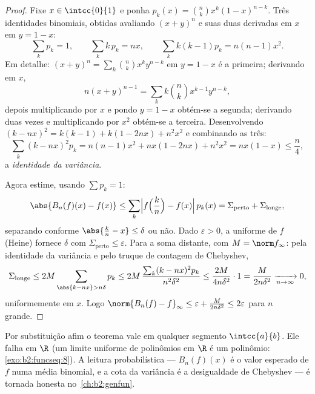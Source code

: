 \begin{proof}
Fixe $x \in \intcc{0}{1}$ e ponha $p_k(x) = \binom nk x^k(1 -
x)^{n-k}$. Três identidades binomiais, obtidas avaliando
$(x + y)^n$ e suas duas derivadas em $x$ em $y = 1 - x$:
\[
\sum_k p_k = 1,
\qquad
\sum_k k\,p_k = nx,
\qquad
\sum_k k(k-1) p_k = n(n-1)x^2 .
\]
Em detalhe: $(x+y)^n = \sum_k\binom nk x^ky^{n-k}$ em $y = 1-x$
é a primeira; derivando em $x$,
\[
n(x+y)^{n-1} = \sum_k k\binom nk x^{k-1}y^{n-k} ,
\]
depois multiplicando por $x$ e pondo $y = 1 - x$ obtém-se a
segunda; derivando duas vezes e multiplicando por $x^2$ obtém-se
a terceira. Desenvolvendo $(k - nx)^2 = k(k-1) + k(1 - 2nx) +
n^2x^2$ e combinando as três:
\[
\sum_k (k - nx)^2 p_k
= n(n-1)x^2 + nx(1 - 2nx) + n^2x^2
= nx(1 - x) \leq \frac n4 ,
\]
a \emph{identidade da variância}.

Agora estime, usando $\sum p_k = 1$:
\[
\abs{B_n(f)(x) - f(x)}
\leq \sum_{k} \Bigl| f\Bigl(\frac kn\Bigr) - f(x)\Bigr|\, p_k(x)
= \Sigma_{\text{perto}} + \Sigma_{\text{longe}} ,
\]
separando conforme $\abs{\frac kn - x} \leq \delta$ ou não.
Dado $\varepsilon > 0$, a  uniforme de $f$ (Heine) fornece
$\delta$ com $\Sigma_{\text{perto}} \leq \varepsilon$. Para a soma
distante, com $M = \norm f_\infty$: pela identidade da variância e pelo
truque de contagem de Chebyshev,
\[
\Sigma_{\text{longe}} \leq 2M \sum_{\abs{k - nx} > n\delta} p_k
\leq 2M\,\frac{\sum_k (k - nx)^2 p_k}{n^2\delta^2}
\leq \frac{2M}{4 n \delta^2} \cdot 1
= \frac{M}{2n\delta^2}
\xrightarrow[n\to\infty]{} 0 ,
\]
uniformemente em $x$. Logo $\norm{B_n(f) - f}_\infty \leq \varepsilon +
\frac{M}{2n\delta^2} \leq 2\varepsilon$ para $n$ grande.
\end{proof}

\begin{remark}
Por substituição afim o teorema vale em qualquer segmento
$\intcc{a}{b}$. Ele falha em $\R$ (um limite uniforme de polinômios em
$\R$ é um polinômio: \cref{exo:b2:funcseq:8}). A leitura
probabilística --- $B_n(f)(x)$ é o valor esperado de $f$ numa
média binomial, e a cota da variância é a desigualdade de Chebyshev --- é
tornada honesta no~\cref{ch:b2:genfun}.
\end{remark}

